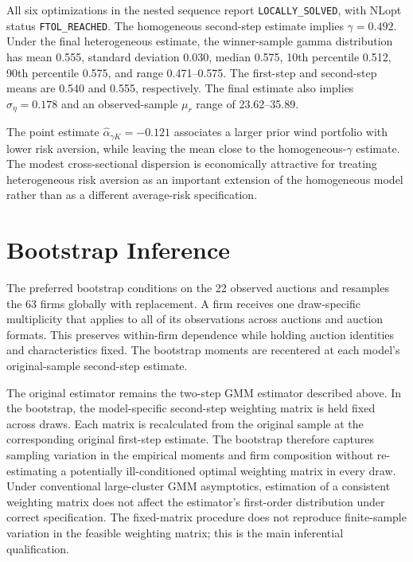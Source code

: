 \documentclass[10pt]{article}
\begin{document}
All six optimizations in the nested sequence report
\texttt{LOCALLY\_SOLVED}, with NLopt status \texttt{FTOL\_REACHED}. The
homogeneous second-step estimate implies $\gamma=0.492$. Under the final
heterogeneous estimate, the winner-sample gamma distribution has mean 0.555,
standard deviation 0.030, median 0.575, 10th percentile 0.512, 90th percentile
0.575, and range 0.471--0.575. The first-step and second-step means are 0.540
and 0.555, respectively. The final estimate also implies
$\widehat\sigma_\eta=0.178$ and an observed-sample $\mu_r$ range of
23.62--35.89.

The point estimate $\widehat\alpha_{\gamma K}=-0.121$ associates a larger
prior wind portfolio with lower risk aversion, while leaving the mean close to
the homogeneous-$\gamma$ estimate. The modest cross-sectional dispersion is
economically attractive for treating heterogeneous risk aversion as an
important extension of the homogeneous model rather than as a different
average-risk specification.

\section{Bootstrap Inference}

The preferred bootstrap conditions on the 22 observed auctions and resamples
the 63 firms globally with replacement. A firm receives one draw-specific
multiplicity that applies to all of its observations across auctions and
auction formats. This preserves within-firm dependence while holding auction
identities and characteristics fixed. The bootstrap moments are recentered at
each model's original-sample second-step estimate.

The original estimator remains the two-step GMM estimator described above. In
the bootstrap, the model-specific second-step weighting matrix is held fixed
across draws. Each matrix is recalculated from the original sample at the
corresponding original first-step estimate. The bootstrap therefore captures
sampling variation in the empirical moments and firm composition without
re-estimating a potentially ill-conditioned optimal weighting matrix in every
draw. Under conventional large-cluster GMM asymptotics, estimation of a
consistent weighting matrix does not affect the estimator's first-order
distribution under correct specification. The fixed-matrix procedure does not
reproduce finite-sample variation in the feasible weighting matrix; this is the
main inferential qualification.
\end{document}

